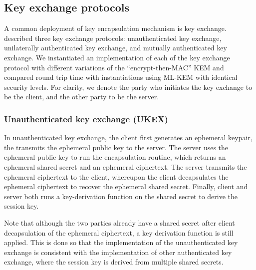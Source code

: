 \documentclass[floatrow,journal=tches,submission]{iacrtrans}
\begin{document}
\subsection{Key exchange protocols}\label{sec:key-exchange-protocols}
A common deployment of key encapsulation mechanism is key exchange. \cite{bos2018crystals} described three key exchange protocols: unauthenticated key exchange, unilaterally authenticated key exchange, and mutually authenticated key exchange. We instantiated an implementation of each of the key exchange protocol with different variations of the ``encrypt-then-MAC'' KEM and compared round trip time with instantiations using ML-KEM with identical security levels. For clarity, we denote the party who initiates the key exchange to be the client, and the other party to be the server.

\subsubsection{Unauthenticated key exchange (UKEX)}\label{sec:unauthenticated-key-exchange}
In unauthenticated key exchange, the client first generates an ephemeral keypair, the transmits the ephemeral public key to the server. The server uses the ephemeral public key to run the encapsulation routine, which returns an ephemeral shared secret and an ephemeral ciphertext. The server transmits the ephemeral ciphertext to the client, whereupon the client decapsulates the ephemeral ciphertext to recover the ephemeral shared secret. Finally, client and server both runs a key-derivation function on the shared secret to derive the session key.

Note that although the two parties already have a shared secret after client decapsulation of the ephemeral ciphertext, a key derivation function is still applied. This is done so that the implementation of the unauthenticated key exchange is consistent with the implementation of other authenticated key exchange, where the session key is derived from multiple shared secrets.
\end{document}
